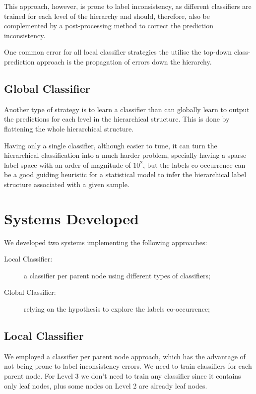 \documentclass[11pt,a4paper]{article}
\begin{document}
This approach, however, is prone to label inconsistency, as different classifiers are
trained for each level of the hierarchy and should, therefore, also
be complemented by a post-processing method to correct the prediction inconsistency.

One common error for all local classifier strategies the utilise the top-down class-prediction
approach is the propagation of errors down the hierarchy.



\subsection{Global Classifier}

Another type of strategy is to learn a classifier than can globally learn to
output the predictions for each level in the hierarchical structure. This is
done by flattening the whole hierarchical structure.

Having only a single classifier, although easier to tune, it can turn the
hierarchical classification into a much harder problem, specially having a
sparse label space with an order of magnitude of $10^2$, but the labels co-occurrence
can be a good guiding heuristic for a statistical model to infer the hierarchical
label structure associated with a given sample.

\section{Systems Developed}\label{system}

We developed two systems implementing the following approaches:

\begin{description}
  \item[Local Classifier:] a classifier per parent node using
  different types of classifiers;
  \item[Global Classifier:] relying on the hypothesis
  to explore the labels co-occurrence;
\end{description}

\subsection{Local Classifier}

We employed a classifier per parent node approach, which has the advantage of not being
prone to label inconsistency errors. We need to train classifiers for each
parent node. For Level 3 we don't need to train any classifier since it
contains only leaf nodes, plus some nodes on Level 2 are already leaf nodes.
\end{document}
